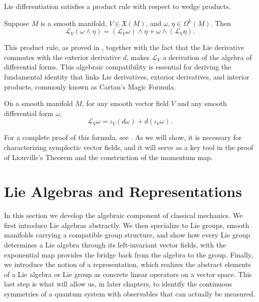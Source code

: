 Lie differentiation satisfies a product rule with respect to wedge products.

\begin{proposition}
	Suppose $M$ is a smooth manifold, $V \in \mathfrak{X}(M)$, and $\omega, \eta \in \Omega^k(M)$. Then
	\[
	\mathscr{L}_V(\omega \wedge \eta) = (\mathscr{L}_V\omega) \wedge \eta + \omega \wedge (\mathscr{L}_V\eta).
	\]
\end{proposition}

This product rule, as proved in \cite[Proposition 14.33]{leeIntroductionSmoothManifolds2013}, together with the fact that the Lie derivative commutes with the exterior derivative $d$, makes $\mathscr{L}_V$ a derivation of the algebra of differential forms. This algebraic compatibility is essential for deriving the fundamental identity that links Lie derivatives, exterior derivatives, and interior products, commonly known as Cartan's Magic Formula. 

\begin{theorem}\label{thm:cartan}
	On a smooth manifold $M$, for any smooth vector field $V$ and any smooth differential form $\omega$,
	\begin{equation}
		\mathscr{L}_V\omega = \iota_V(d\omega) + d(\iota_V\omega).\label{eq:cartan}
	\end{equation}
\end{theorem}

For a complete proof of this formula, see \cite[Theorem 14.35]{leeIntroductionSmoothManifolds2013}. As we will show, it is necessary for characterizing symplectic vector fields, and it will serve as a key tool in the proof of Liouville's Theorem and the construction of the momentum map.


\section{Lie Algebras and Representations}
In this section we develop the algebraic component of classical mechanics. We first introduce Lie algebras abstractly. We then specialize to Lie groups, smooth manifolds carrying a compatible group structure, and show how every Lie group determines a Lie algebra through its left-invariant vector fields, with the exponential map provides the bridge back from the algebra to the group. Finally, we introduce the notion of a representation, which realizes the abstract elements of a Lie algebra or Lie group as concrete linear operators on a vector space. This last step is what will allow us, in later chapters, to identify the continuous symmetries of a quantum system with observables that can actually be measured.

